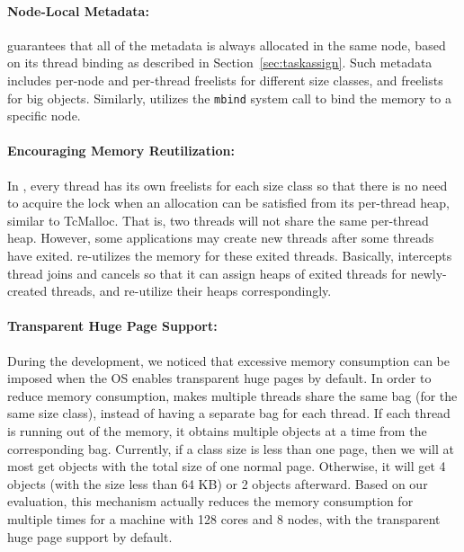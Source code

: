 \paragraph{Node-Local Metadata:} \NM{} guarantees that all of the metadata is always allocated in the same node, based on its thread binding as described in Section~\ref{sec:taskassign}. Such metadata includes per-node and per-thread freelists for different size classes, and freelists for big objects. Similarly, \NM{} utilizes the \texttt{mbind} system call to bind the memory to a specific node.  

\paragraph{Encouraging Memory Reutilization:} In \NM{}, every thread has its own freelists for each size class so that there is no need to acquire the lock when an allocation can be satisfied from its per-thread heap, similar to TcMalloc. That is, two threads will not share the same per-thread heap. However, some applications may create new threads after some threads have exited. \NM{} re-utilizes the memory for these exited threads. Basically, \NM{} intercepts thread joins and cancels so that it can assign heaps of exited threads for newly-created threads, and re-utilize their heaps correspondingly.  


\paragraph{Transparent Huge Page Support:} During the development, we noticed that excessive memory consumption can be imposed when the OS enables transparent huge pages by default. In order to reduce memory consumption, \NM{} makes multiple threads share the same bag (for the same size class), instead of having a separate bag for each thread. If each thread is running out of the memory, it obtains multiple objects at a time from the corresponding bag. Currently, if a class size is less than one page, then we will at most get objects with the total size of one normal page. Otherwise, it will get 4 objects (with the size less than 64 KB) or 2 objects afterward. Based on our evaluation, this mechanism actually reduces the memory consumption for multiple times for a machine with 128 cores and 8 nodes, with the transparent huge page support by default.  

